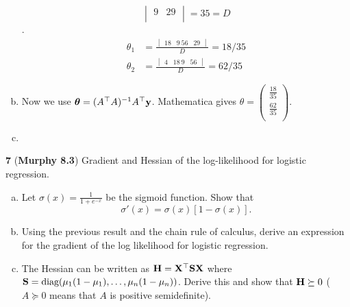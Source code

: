 \documentclass[12pt,letterpaper,fleqn]{hmcpset}
\begin{document}
\begin{enumerate}[(a)]
$$\begin{vmatrix}
                 9 & 29 \\
            \end{vmatrix} = 35 = D$$.
        \begin{align*}
            \theta_1 &= \frac{
                \begin{vmatrix}
                    18 & 9\
                    56 & 29
                \end{vmatrix}
            }{D} = 18/35\\
            \theta_2 &= \frac{
                \begin{vmatrix}
                    4 & 18\
                    9 & 56
                \end{vmatrix}
            }{D} =62/35
        \end{align*}
         
    \item
        Now we use $\hbox{\boldmath$\theta$} = (A^\top A)^{-1}A^\top {\bf y}$. Mathematica gives 
        $\theta = \left(
\begin{array}{c}
 \frac{18}{35} \\
 \frac{62}{35} \\
\end{array}
\right)$.

    \item

         
\end{enumerate}
\newpage

\textbf{7} (\textbf{Murphy 8.3}) Gradient and Hessian of the log-likelihood for
logistic regression.
\begin{enumerate}[(a)]
    \item Let $\sigma(x) = \frac{1}{1 + e^{-x}}$ be the sigmoid function. Show that
        \[
            \sigma'(x) = \sigma(x)\left[1 - \sigma(x)\right].
        \]
    \item Using the previous result and the chain rule of calculus, derive an
        expression for the gradient of the log likelihood for logistic regression.
    \item The Hessian can be written as ${\bf H}={\bf X}^\top{\bf S}{\bf X}$ where ${\bf S} =
        {\hbox{diag}}(\mu_1(1-\mu_1), \dots, \mu_n(1-\mu_n))$. Derive this and show that
        ${\bf H} \succeq 0$ ($A \succeq 0$ means that $A$ is positive semidefinite).
\end{enumerate}

\vspace{20mm}
\end{document}
